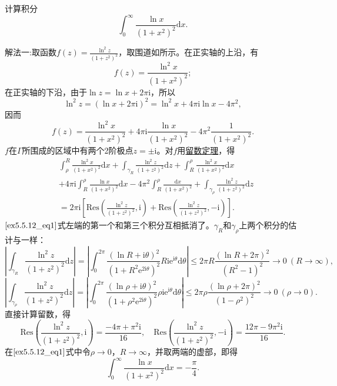 \documentclass[../../main.tex]{subfiles}%
\begin{document}
\begin{example}
计算积分
\[
\int_{0}^{\infty} \frac{\ln x}{(1 + x^2)^2} \mathrm{d}x.
\]
\end{example}
\begin{solution}

{\color{blue}解法一:}取函数\( f(z) = \frac{\ln^2 z}{(1 + z^2)^2} \)，取围道如所示。在正实轴的上沿，有
\[
f(z) = \frac{\ln^2 x}{(1 + x^2)^2};
\]
在正实轴的下沿，由于\( \ln z = \ln x + 2\pi \mathrm{i} \)，所以
\[
\ln^2 z = (\ln x + 2\pi \mathrm{i})^2
= \ln^2 x + 4\pi \mathrm{i} \ln x - 4\pi^2,
\]
因而
\[
f(z) = \frac{\ln^2 x}{(1 + x^2)^2} + 4\pi \mathrm{i} \frac{\ln x}{(1 + x^2)^2} - 4\pi^2 \frac{1}{(1 + x^2)^2}.
\]
\( f \)在\( \Gamma \)所围成的区域中有两个2阶极点\( z = \pm \mathrm{i} \)。对\( f \)用\hyperref[theorem:留数定理(残数定理)-定理5.4.9]{留数定理}，得
\begin{align}
&\int_{\rho}^{R} \frac{\ln^2 x}{(1 + x^2)^2} \mathrm{d}x + \int_{\gamma_R} \frac{\ln^2 z}{(1 + z^2)^2} \mathrm{d}z + \int_{R}^{\rho} \frac{\ln^2 x}{(1 + x^2)^2} \mathrm{d}x
\nonumber\\
&+ 4\pi \mathrm{i} \int_{R}^{\rho} \frac{\ln x}{(1 + x^2)^2} \mathrm{d}x - 4\pi^2 \int_{R}^{\rho} \frac{\mathrm{d}x}{(1 + x^2)^2} + \int_{\gamma_{\rho}} \frac{\ln^2 z}{(1 + z^2)^2} \mathrm{d}z
\nonumber\\
&= 2\pi \mathrm{i} \left[ \mathrm{Res}\left( \frac{\ln^2 z}{(1 + z^2)^2}, \mathrm{i} \right) + \mathrm{Res}\left( \frac{\ln^2 z}{(1 + z^2)^2}, -\mathrm{i} \right) \right]. \label{ex5.5.12_eq1}
\end{align}
\(\eqref{ex5.5.12_eq1}\)式左端的第一个和第三个积分互相抵消了。\( \gamma_R \)和\( \gamma_{\rho} \)上两个积分的估计与一样：
\[
\left| \int_{\gamma_R} \frac{\ln^2 z}{(1 + z^2)^2} \mathrm{d}z \right| = \left| \int_{0}^{2\pi} \frac{(\ln R + \mathrm{i}\theta)^2}{(1 + R^2 \mathrm{e}^{2\mathrm{i}\theta})^2} R\mathrm{i}\mathrm{e}^{\mathrm{i}\theta} \mathrm{d}\theta \right|
\leqslant 2\pi R \frac{(\ln R + 2\pi)^2}{(R^2 - 1)^2}
\to 0 \ (R \to \infty),
\]
\[
\left| \int_{\gamma_{\rho}} \frac{\ln^2 z}{(1 + z^2)^2} \mathrm{d}z \right| = \left| \int_{0}^{2\pi} \frac{(\ln \rho + \mathrm{i}\theta)^2}{(1 + \rho^2 \mathrm{e}^{2\mathrm{i}\theta})^2} \rho\mathrm{i}\mathrm{e}^{\mathrm{i}\theta} \mathrm{d}\theta \right|
\leqslant 2\pi \rho \frac{(\ln \rho + 2\pi)^2}{(1 - \rho^2)^2}
\to 0 \ (\rho \to 0).
\]
直接计算留数，得
\[
\mathrm{Res}\left( \frac{\ln^2 z}{(1 + z^2)^2}, \mathrm{i} \right) = \frac{-4\pi + \pi^2 \mathrm{i}}{16},
\quad
\mathrm{Res}\left( \frac{\ln^2 z}{(1 + z^2)^2}, -\mathrm{i} \right) = \frac{12\pi - 9\pi^2 \mathrm{i}}{16}.
\]
在\(\eqref{ex5.5.12_eq1}\)式中令\( \rho \to 0 \)，\( R \to \infty \)，并取两端的虚部，即得
\[
\int_{0}^{\infty} \frac{\ln x}{(1 + x^2)^2} \mathrm{d}x = -\frac{\pi}{4}.
\]


\end{solution}
\end{document}
